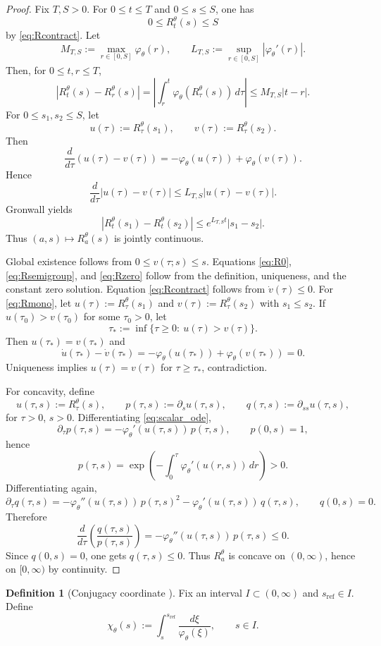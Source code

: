 \documentclass{article}
\theoremstyle{definition}
\newtheorem{definition}[theorem]{Definition}
\begin{document}
\begin{proof}
Fix $T,S>0$.
For $0\le t\le T$ and $0\le s\le S$, one has
\[
0\le R_t^\theta(s)\le S
\]
by \eqref{eq:Rcontract}.
Let
\[
M_{T,S}:=\max_{r\in[0,S]}\varphi_\theta(r),
\qquad
L_{T,S}:=\sup_{r\in[0,S]}|\varphi_\theta'(r)|.
\]
Then, for $0\le t,r\le T$,
\[
|R_t^\theta(s)-R_r^\theta(s)|
=
\left|
\int_r^t \varphi_\theta(R_\tau^\theta(s))\,d\tau
\right|
\le
M_{T,S}|t-r|.
\]
For $0\le s_1,s_2\le S$, let
\[
u(\tau):=R_\tau^\theta(s_1),
\qquad
v(\tau):=R_\tau^\theta(s_2).
\]
Then
\[
\frac{d}{d\tau}(u(\tau)-v(\tau))
=
-\varphi_\theta(u(\tau))+\varphi_\theta(v(\tau)).
\]
Hence
\[
\frac{d}{d\tau}|u(\tau)-v(\tau)|
\le
L_{T,S}|u(\tau)-v(\tau)|.
\]
Gronwall yields
\[
|R_t^\theta(s_1)-R_t^\theta(s_2)|
\le
e^{L_{T,S}t}|s_1-s_2|.
\]
Thus $(a,s)\mapsto R_a^\theta(s)$ is jointly continuous.

Global existence follows from $0\le v(\tau;s)\le s$.
Equations \eqref{eq:R0}, \eqref{eq:Rsemigroup}, and \eqref{eq:Rzero} follow from the definition, uniqueness, and the constant zero solution.
Equation \eqref{eq:Rcontract} follows from $\dot v(\tau)\le 0$.
For \eqref{eq:Rmono}, let $u(\tau):=R_\tau^\theta(s_1)$ and $v(\tau):=R_\tau^\theta(s_2)$ with $s_1\le s_2$.
If $u(\tau_0)>v(\tau_0)$ for some $\tau_0>0$, let
\[
\tau_*:=\inf\{\tau\ge 0:\ u(\tau)>v(\tau)\}.
\]
Then $u(\tau_*)=v(\tau_*)$ and
\[
\dot u(\tau_*)-\dot v(\tau_*)
=
-\varphi_\theta(u(\tau_*))+\varphi_\theta(v(\tau_*))
=
0.
\]
Uniqueness implies $u(\tau)=v(\tau)$ for $\tau\ge \tau_*$, contradiction.

For concavity, define
\[
u(\tau,s):=R_\tau^\theta(s),
\qquad
p(\tau,s):=\partial_su(\tau,s),
\qquad
q(\tau,s):=\partial_{ss}u(\tau,s),
\]
for $\tau>0$, $s>0$.
Differentiating \eqref{eq:scalar_ode},
\[
\partial_\tau p(\tau,s)
=
-\varphi_\theta'(u(\tau,s))\,p(\tau,s),
\qquad
p(0,s)=1,
\]
hence
\[
p(\tau,s)
=
\exp\!\left(
-\int_0^\tau \varphi_\theta'(u(r,s))\,dr
\right)>0.
\]
Differentiating again,
\[
\partial_\tau q(\tau,s)
=
-\varphi_\theta''(u(\tau,s))\,p(\tau,s)^2
-
\varphi_\theta'(u(\tau,s))\,q(\tau,s),
\qquad
q(0,s)=0.
\]
Therefore
\[
\frac{d}{d\tau}\left(\frac{q(\tau,s)}{p(\tau,s)}\right)
=
-\varphi_\theta''(u(\tau,s))\,p(\tau,s)
\le 0.
\]
Since $q(0,s)=0$, one gets $q(\tau,s)\le 0$.
Thus $R_a^\theta$ is concave on $(0,\infty)$, hence on $[0,\infty)$ by continuity.
\end{proof}

\begin{definition}[Conjugacy coordinate {\cite{Bellman}}]
\label{def:chi}
Fix an interval $I\subset(0,\infty)$ and $s_{\mathrm{ref}}\in I$.
Define
\begin{equation*}
\chi_\theta(s)
:=
\int_s^{s_{\mathrm{ref}}}\frac{d\xi}{\varphi_\theta(\xi)},
\qquad
s\in I.
\end{equation*}
\end{definition}
\end{document}
